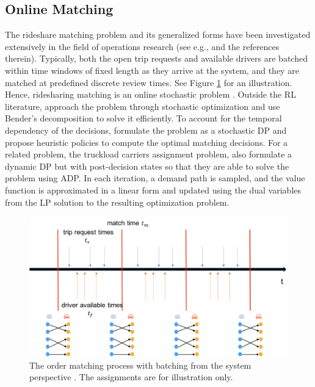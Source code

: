 \documentclass{article}
\newcommand{\tq}[1]{\textcolor{red}{#1}}
\begin{document}
\subsection{Online Matching}\label{sec:matching}
The rideshare matching problem and its generalized forms have been investigated extensively in the field of operations research (see e.g., \citep{ozkan2017dynamic,hu2022dynamic,lowalekar2018online} and the references therein). Typically, both the open trip requests and available drivers are batched within time windows of fixed length as they arrive at the system, and they are matched at predefined discrete review times. See Figure \ref{fig:batch_match} for an illustration. Hence, ridesharing matching is an online stochastic problem \citep{qin2020ride}.
Outside the RL literature, \cite{lowalekar2018online} approach the problem through stochastic optimization and use Bender's decomposition to solve it efficiently. To account for the temporal dependency of the decisions, \cite{hu2022dynamic} formulate the problem as a stochastic DP and propose heuristic policies to compute the optimal matching decisions. 
For a related problem, the truckload carriers assignment problem, \cite{simao2009approximate} also formulate a dynamic DP but with post-decision states so that they are able to solve the problem using ADP. In each iteration, a demand path is sampled, and the value function is approximated in a linear form and updated using the dual variables from the LP solution to the resulting optimization problem.  

\begin{figure}
\begin{center}
        \includegraphics[width=0.9\linewidth]{img/batch_match.png}
	\caption{The order matching process with batching from the system perspective \citep{qin2020ride}. The assignments are for illustration only.}
	\label{fig:batch_match}
\end{center}
\end{figure}
\end{document}
